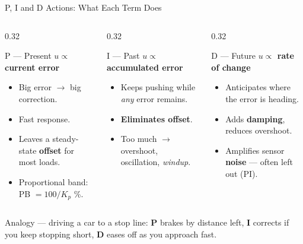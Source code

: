 \documentclass[aspectratio=169]{beamer}
\begin{document}
	\begin{frame}{P, I and D Actions: What Each Term Does}
		\begin{columns}[T]
			\begin{column}{0.32\textwidth}
				\begin{block}{P --- Present}
					\centering
					\textbf{$u \propto$ current error}

					\vspace{0.2cm}

					\begin{itemize}\small
						\item Big error $\rightarrow$ big correction.
						\item Fast response.
						\item Leaves a steady-state \textbf{offset} for most loads.
						\item Proportional band: PB $= 100/K_p$ \%.
					\end{itemize}
				\end{block}
			\end{column}
			\begin{column}{0.32\textwidth}
				\begin{block}{I --- Past}
					\centering
					\textbf{$u \propto$ accumulated error}

					\vspace{0.2cm}

					\begin{itemize}\small
						\item Keeps pushing while \emph{any} error remains.
						\item \textbf{Eliminates offset}.
						\item Too much $\rightarrow$ overshoot, oscillation, \emph{windup}.
					\end{itemize}
				\end{block}
			\end{column}
			\begin{column}{0.32\textwidth}
				\begin{block}{D --- Future}
					\centering
					\textbf{$u \propto$ rate of change}

					\vspace{0.2cm}

					\begin{itemize}\small
						\item Anticipates where the error is heading.
						\item Adds \textbf{damping}, reduces overshoot.
						\item Amplifies sensor \textbf{noise} --- often left out (PI).
					\end{itemize}
				\end{block}
			\end{column}
		\end{columns}
		\vspace{0.35cm}
		\begin{center}
			\small
			Analogy --- driving a car to a stop line: \textbf{P} brakes by distance left, \textbf{I} corrects if you keep stopping short, \textbf{D} eases off as you approach fast.
		\end{center}
	\end{frame}
\end{document}
